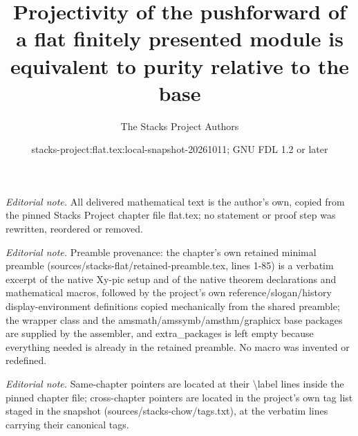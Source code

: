 \documentclass[10pt,a4paper]{amsart}
\title{Projectivity of the pushforward of a flat finitely presented module is equivalent to purity relative to the base}
\author{The Stacks Project Authors}
\date{stacks-project:flat.tex:local-snapshot-20261011; GNU FDL 1.2 or later}
\theoremstyle{plain}
\theoremstyle{definition}
\theoremstyle{remark}
\numberwithin{equation}{subsection}
\begin{document}
\maketitle
\noindent\textit{Editorial note.} All delivered mathematical text is the author's own, copied from the pinned Stacks Project chapter file flat.tex; no statement or proof step was rewritten, reordered or removed.\par\medskip
\noindent\textit{Editorial note.} Preamble provenance: the chapter's own retained minimal preamble (sources/stacks-flat/retained-preamble.tex, lines 1-85) is a verbatim excerpt of the native Xy-pic setup and of the native theorem declarations and mathematical macros, followed by the project's own reference/slogan/history display-environment definitions copied mechanically from the shared preamble; the wrapper class and the amsmath/amssymb/amsthm/graphicx base packages are supplied by the assembler, and extra\_packages is left empty because everything needed is already in the retained preamble. No macro was invented or redefined.\par\medskip
\noindent\textit{Editorial note.} Same-chapter pointers are located at their \textbackslash{}label lines inside the pinned chapter file; cross-chapter pointers are located in the project's own tag list staged in the snapshot (sources/stacks-chow/tags.txt), at the verbatim lines carrying their canonical tags.\par\medskip
\end{document}
